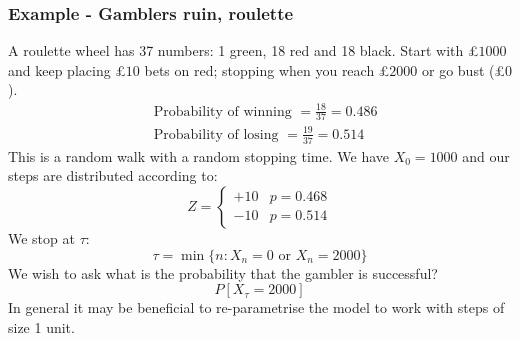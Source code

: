 \documentclass[12pt]{article}
\begin{document}
\subsubsection*{Example - Gamblers ruin, roulette}
A roulette wheel has 37 numbers: 1 green, 18 red and 18 black. Start with £\(1000\) and keep placing £\(10\) bets on red; stopping when you reach £\(2000\) or go bust (£\(0\)). 
\begin{align*}
    &\text{Probability of winning }=\frac{18}{37}=0.486 \\
    &\text{Probability of losing }=\frac{19}{37}=0.514
\end{align*}
This is a random walk with a random stopping time. We have \(X_0=1000\) and our steps are distributed according to:
\[Z=\begin{cases}
    +10 & p=0.468 \\
    -10 &  p=0.514
\end{cases}\]
We stop at \(\tau\):
\[\tau=\min\{n:X_n=0\text{ or }X_n=2000\}\]
We wish to ask what is the probability that the gambler is successful?
\[P[X_\tau=2000]\]
In general it may be beneficial to re-parametrise the model to work with steps of size 1 unit.
\end{document}
